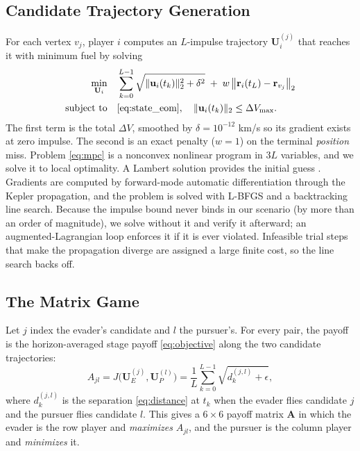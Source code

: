 \documentclass[letterpaper, 10 pt, conference]{ieeeconf}  %
\begin{document}

\subsection{Candidate Trajectory Generation}

For each vertex $v_j$, player $i$ computes an $L$-impulse trajectory $\mathbf{U}_i^{(j)}$ that reaches it with minimum fuel by solving
%
\begin{equation}
    \begin{aligned}
        \min_{\mathbf{U}_i} \quad & \sum_{k=0}^{L-1} \sqrt{\|\mathbf{u}_i(t_k)\|_2^2 + \delta^2} \; + \; w\,\big\|\mathbf{r}_i(t_L) - \mathbf{r}_{v_j}\big\|_2 \\
        \text{subject to} \quad & \eqref{eq:state_eom}, \quad \|\mathbf{u}_i(t_k)\|_2 \leq \Delta V_{\max} .
    \end{aligned}
    \label{eq:mpc}
\end{equation}
%
The first term is the total $\Delta V$, smoothed by $\delta = 10^{-12}$ km/s so its gradient exists at zero impulse. The second is an exact penalty ($w = 1$) on the terminal \emph{position} miss. Problem \eqref{eq:mpc} is a nonconvex nonlinear program in $3L$ variables, and we solve it to local optimality. A Lambert solution provides the initial guess \cite{vallado2001fundamentals}. Gradients are computed by forward-mode automatic differentiation through the Kepler propagation, and the problem is solved with L-BFGS and a backtracking line search. Because the impulse bound never binds in our scenario (by more than an order of magnitude), we solve without it and verify it afterward; an augmented-Lagrangian loop enforces it if it is ever violated. Infeasible trial steps that make the propagation diverge are assigned a large finite cost, so the line search backs off.


\subsection{The Matrix Game}

Let $j$ index the evader's candidate and $l$ the pursuer's. For every pair, the payoff is the horizon-averaged stage payoff \eqref{eq:objective} along the two candidate trajectories:
%
\begin{equation}
    A_{jl} = J\big(\mathbf{U}_E^{(j)}, \mathbf{U}_P^{(l)}\big) = \frac{1}{L} \sum_{k=0}^{L-1} \sqrt{d_k^{(j,l)} + \epsilon},
    \label{eq:ave_stage_cost}
\end{equation}
%
where $d_k^{(j,l)}$ is the separation \eqref{eq:distance} at $t_k$ when the evader flies candidate $j$ and the pursuer flies candidate $l$. This gives a $6 \times 6$ payoff matrix $\mathbf{A}$ in which the evader is the row player and \emph{maximizes} $A_{jl}$, and the pursuer is the column player and \emph{minimizes} it.
\end{document}
